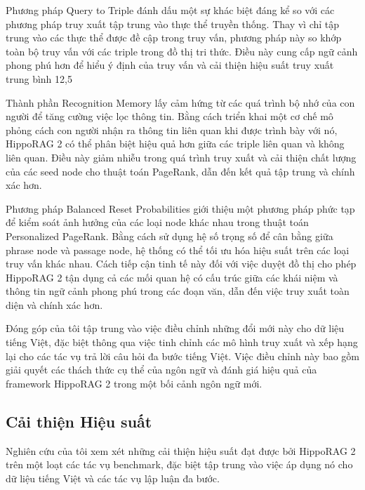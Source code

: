 \documentclass[../main.tex]{subfiles}
\begin{document}
Phương pháp Query to Triple đánh dấu một sự khác biệt đáng kể so với các phương pháp truy xuất tập trung vào thực thể truyền thống. Thay vì chỉ tập trung vào các thực thể được đề cập trong truy vấn, phương pháp này so khớp toàn bộ truy vấn với các triple trong đồ thị tri thức. Điều này cung cấp ngữ cảnh phong phú hơn để hiểu ý định của truy vấn và cải thiện hiệu suất truy xuất trung bình 12,5%

Thành phần Recognition Memory lấy cảm hứng từ các quá trình bộ nhớ của con người để tăng cường việc lọc thông tin. Bằng cách triển khai một cơ chế mô phỏng cách con người nhận ra thông tin liên quan khi được trình bày với nó, HippoRAG 2 có thể phân biệt hiệu quả hơn giữa các triple liên quan và không liên quan. Điều này giảm nhiễu trong quá trình truy xuất và cải thiện chất lượng của các seed node cho thuật toán PageRank, dẫn đến kết quả tập trung và chính xác hơn.

Phương pháp Balanced Reset Probabilities giới thiệu một phương pháp phức tạp để kiểm soát ảnh hưởng của các loại node khác nhau trong thuật toán Personalized PageRank. Bằng cách sử dụng hệ số trọng số để cân bằng giữa phrase node và passage node, hệ thống có thể tối ưu hóa hiệu suất trên các loại truy vấn khác nhau. Cách tiếp cận tinh tế này đối với việc duyệt đồ thị cho phép HippoRAG 2 tận dụng cả các mối quan hệ có cấu trúc giữa các khái niệm và thông tin ngữ cảnh phong phú trong các đoạn văn, dẫn đến việc truy xuất toàn diện và chính xác hơn.

Đóng góp của tôi tập trung vào việc điều chỉnh những đổi mới này cho dữ liệu tiếng Việt, đặc biệt thông qua việc tinh chỉnh các mô hình truy xuất và xếp hạng lại cho các tác vụ trả lời câu hỏi đa bước tiếng Việt. Việc điều chỉnh này bao gồm giải quyết các thách thức cụ thể của ngôn ngữ và đánh giá hiệu quả của framework HippoRAG 2 trong một bối cảnh ngôn ngữ mới.

\subsection{Cải thiện Hiệu suất}
Nghiên cứu của tôi xem xét những cải thiện hiệu suất đạt được bởi HippoRAG 2 trên một loạt các tác vụ benchmark, đặc biệt tập trung vào việc áp dụng nó cho dữ liệu tiếng Việt và các tác vụ lập luận đa bước.
\end{document}
